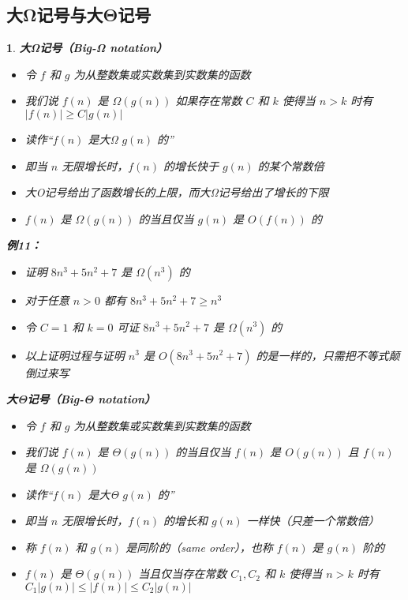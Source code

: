 \documentclass[UTF8]{report}
\theoremstyle{MyLineTheoremStyle} %
\theoremstyle{MyBlockTheoremStyle} %
\theoremstyle{MySubsubsectionStyle} %
\newtheorem{definition}{}
\begin{document}
\subsection{大Ω记号与大Θ记号}

\begin{definition}
    \textbf{大Ω记号（Big-Ω notation）}
    \begin{itemize}
        \item 令 $f$ 和 $g$ 为从整数集或实数集到实数集的函数
        \item 我们说 $f(n)$ 是 $\Omega(g(n))$ 如果存在常数 $C$ 和 $k$ 使得当 $n > k$ 时有 $|f(n)| \geq C |g(n)|$
        \item 读作“$f(n)$ 是大Ω $g(n)$ 的”
        \item 即当 $n$ 无限增长时，$f(n)$ 的增长快于 $g(n)$ 的某个常数倍
        \item 大O记号给出了函数增长的上限，而大Ω记号给出了增长的下限
        \item $f(n)$ 是 $\Omega(g(n))$ 的当且仅当 $g(n)$ 是 $O(f(n))$ 的
    \end{itemize}

    \textbf{例11：}
    \begin{itemize}
        \item 证明 $8n^3 + 5n^2 + 7$ 是 $\Omega(n^3)$ 的
        \item 对于任意 $n > 0$ 都有 $8n^3 + 5n^2 + 7 \geq n^3$
        \item 令 $C = 1$ 和 $k = 0$ 可证 $8n^3 + 5n^2 + 7$ 是 $\Omega(n^3)$ 的
        \item 以上证明过程与证明 $n^3$ 是 $O(8n^3 + 5n^2 + 7)$ 的是一样的，只需把不等式颠倒过来写
    \end{itemize}

    \textbf{大Θ记号（Big-Θ notation）}
    \begin{itemize}
        \item 令 $f$ 和 $g$ 为从整数集或实数集到实数集的函数
        \item 我们说 $f(n)$ 是 $\Theta(g(n))$ 的当且仅当 $f(n)$ 是 $O(g(n))$ 且 $f(n)$ 是 $\Omega(g(n))$
        \item 读作“$f(n)$ 是大Θ $g(n)$ 的”
        \item 即当 $n$ 无限增长时，$f(n)$ 的增长和 $g(n)$ 一样快（只差一个常数倍）
        \item 称 $f(n)$ 和 $g(n)$ 是同阶的（same order），也称 $f(n)$ 是 $g(n)$ 阶的
        \item $f(n)$ 是 $\Theta(g(n))$ 当且仅当存在常数 $C_1, C_2$ 和 $k$ 使得当 $n > k$ 时有 $C_1 |g(n)| \leq |f(n)| \leq C_2 |g(n)|$
    \end{itemize}


\end{definition}
\end{document}
